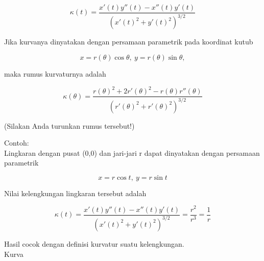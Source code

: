 \documentclass{article}
\begin{document}
\begin{eulernotebook}
\begin{eulercomment}
\begin{eulercomment}
\begin{eulercomment}
\begin{eulercomment}
\begin{eulercomment}
\begin{eulercomment}
\begin{eulercomment}
\begin{eulercomment}
\begin{eulercomment}
\begin{eulercomment}
\begin{eulercomment}
\begin{eulercomment}
\begin{eulercomment}
\begin{eulercomment}
\begin{eulercomment}
\begin{eulercomment}
\begin{eulercomment}
\begin{eulercomment}
\begin{eulercomment}
\begin{eulercomment}
\begin{eulercomment}
\begin{eulercomment}
\begin{eulercomment}
\end{eulercomment}
\begin{eulerformula}
\[
\kappa(t) = \frac{x'(t)y''(t)-x''(t)y'(t)}{\left(x'(t)^2+y'(t)^2\right)^{3/2}}
\]
\end{eulerformula}
\begin{eulercomment}
Jika kurvanya dinyatakan dengan persamaan parametrik pada koordinat
kutub

\end{eulercomment}
\begin{eulerformula}
\[
x=r(\theta)\cos\theta,\ y=r(\theta)\sin\theta,
\]
\end{eulerformula}
\begin{eulercomment}
maka rumus kurvaturnya adalah

\end{eulercomment}
\begin{eulerformula}
\[
\kappa(\theta) = \frac{r(\theta)^2+2r'(\theta)^2-r(\theta)r''(\theta)}{\left(r'(\theta)^2+r'(\theta)^2\right)^{3/2}}
\]
\end{eulerformula}
\begin{eulercomment}
(Silakan Anda turunkan rumus tersebut!)

Contoh:\\
Lingkaran dengan pusat (0,0) dan jari-jari r dapat dinyatakan dengan
persamaan parametrik

\end{eulercomment}
\begin{eulerformula}
\[
x=r\cos t,\ y=r\sin t
\]
\end{eulerformula}
\begin{eulercomment}
Nilai kelengkungan lingkaran tersebut adalah

\end{eulercomment}
\begin{eulerformula}
\[
\kappa(t)=\frac{x'(t)y''(t)-x''(t)y'(t)}{\left(x'(t)^2+y'(t)^2\right)^{3/2}}=\frac{r^2}{r^3}=\frac 1 r
\]
\end{eulerformula}
\begin{eulercomment}
Hasil cocok dengan definisi kurvatur suatu kelengkungan.\\
Kurva


\end{eulercomment}
\end{eulercomment}
\end{eulercomment}
\end{eulercomment}
\end{eulercomment}
\end{eulercomment}
\end{eulercomment}
\end{eulercomment}
\end{eulercomment}
\end{eulercomment}
\end{eulercomment}
\end{eulercomment}
\end{eulercomment}
\end{eulercomment}
\end{eulercomment}
\end{eulercomment}
\end{eulercomment}
\end{eulercomment}
\end{eulercomment}
\end{eulercomment}
\end{eulercomment}
\end{eulercomment}
\end{eulercomment}
\end{eulernotebook}
\end{document}
